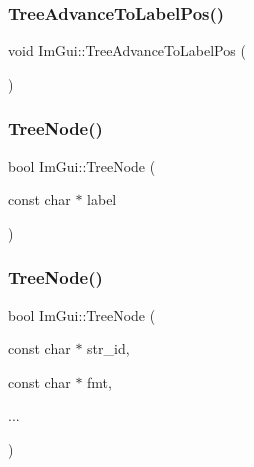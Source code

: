 \hypertarget{namespace_im_gui_a54e15c2f65cea3aeddd66b5dcfb45716}{}\label{namespace_im_gui_a54e15c2f65cea3aeddd66b5dcfb45716} 
\subsubsection{\texorpdfstring{Tree\+Advance\+To\+Label\+Pos()}{TreeAdvanceToLabelPos()}}
{\footnotesize\ttfamily void Im\+Gui\+::\+Tree\+Advance\+To\+Label\+Pos (\begin{DoxyParamCaption}{ }\end{DoxyParamCaption})}

\hypertarget{namespace_im_gui_a4dff507ce8bbe0da9556bb50b1e60d7f}{}\label{namespace_im_gui_a4dff507ce8bbe0da9556bb50b1e60d7f} 
\subsubsection{\texorpdfstring{Tree\+Node()}{TreeNode()}\hspace{0.1cm}{\footnotesize\ttfamily [1/3]}}
{\footnotesize\ttfamily bool Im\+Gui\+::\+Tree\+Node (\begin{DoxyParamCaption}\item[{const char $\ast$}]{label }\end{DoxyParamCaption})}

\hypertarget{namespace_im_gui_a6e6e4de20291002430854cbd8cd58843}{}\label{namespace_im_gui_a6e6e4de20291002430854cbd8cd58843} 
\subsubsection{\texorpdfstring{Tree\+Node()}{TreeNode()}\hspace{0.1cm}{\footnotesize\ttfamily [2/3]}}
{\footnotesize\ttfamily bool Im\+Gui\+::\+Tree\+Node (\begin{DoxyParamCaption}\item[{const char $\ast$}]{str\+\_\+id,  }\item[{const char $\ast$}]{fmt,  }\item[{}]{... }\end{DoxyParamCaption})}

\hypertarget{namespace_im_gui_a47f1421323f90fdd0a9cbfea2338b10f}{}\label{namespace_im_gui_a47f1421323f90fdd0a9cbfea2338b10f} 

